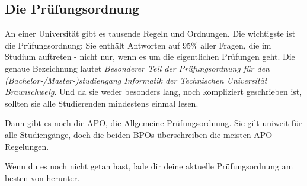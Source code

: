 \subsection{Die Prüfungsordnung}
\label{po}
	An einer Universität gibt es tausende Regeln und Ordnungen. Die wichtigste ist die Prüfungsordnung: Sie enthält Antworten auf 95\% aller Fragen, die im Studium auftreten - nicht nur, wenn es um die eigentlichen Prüfungen geht. Die genaue Bezeichnung lautet \emph{Besonderer Teil der Prüfungsordnung für den (Bachelor-/Master-)studiengang Informatik der Technischen Universität Braunschweig}. Und da sie weder besonders lang, noch kompliziert geschrieben ist, sollten sie alle Studierenden mindestens einmal lesen.

	Dann gibt es noch die APO, die Allgemeine Prüfungsordnung. Sie gilt uniweit für alle Studiengänge, doch die beiden BPOs überschreiben die meisten APO-Regelungen.

	Wenn du es noch nicht getan hast, lade dir deine aktuelle Prüfungsordnung am besten von  herunter. 


